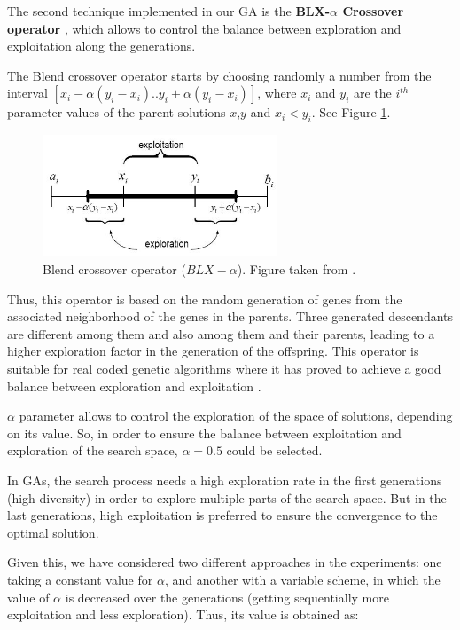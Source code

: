\documentclass[10pt,journal,compsoc]{IEEEtran}
\begin{document}
The second technique implemented in our GA is the \textbf{BLX-$\alpha$ Crossover operator} \cite{blx2008}, which allows to control the balance between exploration and exploitation along the generations.

The Blend crossover operator starts by choosing randomly a number from the interval $[x_i-\alpha(y_i-x_i).. y_i+\alpha(y_i-x_i)]$, where $x_i$ and $y_i$ are the $i^{th}$ parameter values of the parent solutions $x$,$y$ and $x_i < y_i$. See Figure \ref{fig:blxalpha}.

 \begin{figure}[!ht]	
 	\begin{center}
 		\includegraphics[width=7cm]{fig/blxalpha.jpg}
 		\caption{Blend crossover operator ($BLX-\alpha$). Figure taken from \cite{Adibo_BLXFig_03}.}
 		\label{fig:blxalpha}	
 	\end{center}	
 \end{figure}

Thus, this operator is based on the random generation of genes from the associated neighborhood of the genes in the parents. Three generated descendants are different among them and also among them and their parents, leading to a higher exploration factor in the generation of the offspring.
This operator is suitable for real coded genetic algorithms where it has proved to achieve a good balance between exploration and exploitation \cite{blx2008}.

$\alpha$ parameter allows to control the exploration of the space of solutions, depending on its value. So, in order to ensure the balance between exploitation and exploration of the search space, $\alpha = 0.5$ could be selected.

In GAs, the search process needs a high exploration rate in the first generations (high diversity) in order to explore multiple parts of the search space. But in the last generations, high exploitation is preferred to ensure the convergence to the optimal solution.

Given this, we have considered two different approaches in the experiments: one taking a constant value for $\alpha$, and another with a variable scheme, in which the value of $\alpha$ is decreased over the generations (getting sequentially more exploitation and less exploration). Thus, its value is obtained as:
\end{document}
